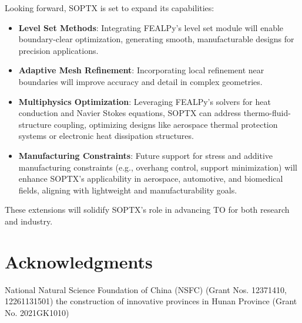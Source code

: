 \documentclass[mathpazo]{cicp}
\begin{document}
Looking forward, SOPTX is set to expand its capabilities:
\begin{itemize} 
	\item \textbf{Level Set Methods}: Integrating FEALPy's level set module will enable boundary-clear optimization, generating smooth, manufacturable designs for precision applications.
	\item \textbf{Adaptive Mesh Refinement}: Incorporating local refinement near boundaries will improve accuracy and detail in complex geometries.
	\item \textbf{Multiphysics Optimization}: Leveraging FEALPy's solvers for heat conduction and Navier Stokes equations, SOPTX can address thermo-fluid-structure coupling, optimizing designs like aerospace thermal protection systems or electronic heat dissipation structures.
	\item \textbf{Manufacturing Constraints}: Future support for stress and additive manufacturing constraints (e.g., overhang control, support minimization) will enhance SOPTX's applicability in aerospace, automotive, and biomedical fields, aligning with lightweight and manufacturability goals.
\end{itemize}
These extensions will solidify SOPTX's role in advancing TO for both research and industry.

\section*{Acknowledgments}
National Natural Science Foundation of China (NSFC) (Grant Nos. 12371410, 12261131501) the construction of innovative provinces in Hunan Province (Grant No. 2021GK1010)

\appendix
\renewcommand{\thesection}{Appendix\,\Alph{section}}
\end{document}
